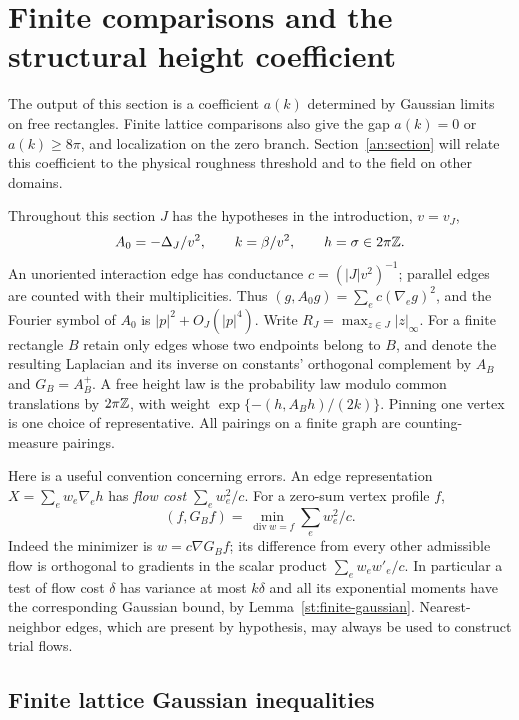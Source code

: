 \section{Finite comparisons and the structural height coefficient}
\label{st:section}

The output of this section is a coefficient $a(k)$ determined by
Gaussian limits on free rectangles.  Finite lattice comparisons also
give the gap $a(k)=0$ or $a(k)\ge8\pi$, and localization on the zero
branch.  Section~\ref{an:section} will relate this coefficient to the
physical roughness threshold and to the field on other domains.

Throughout this section $J$ has the hypotheses in the introduction, $v=v_J$,
\begin{equation}\label{st:normalization}
 A_0=-\Delta_J/v^2,\qquad k=\beta/v^2,\qquad h=\sigma\in2\pi\mathbb Z.
\end{equation}
An unoriented interaction edge has conductance $c=(|J|v^2)^{-1}$; parallel
edges are counted with their multiplicities. Thus
$(g,A_0g)=\sum_e c(\nabla_e g)^2$, and the Fourier symbol of $A_0$ is
$|p|^2+O_J(|p|^4)$. Write $R_J=\max_{z\in J}|z|_\infty$.
For a finite rectangle $B$ retain only edges whose two endpoints belong to
$B$, and denote the resulting Laplacian and its inverse on constants'
orthogonal complement by $A_B$ and $G_B=A_B^+$. A free height law is the
probability law modulo common translations by $2\pi\mathbb Z$, with weight
$\exp\{-(h,A_Bh)/(2k)\}$. Pinning one vertex is one choice of representative.
All pairings on a finite graph are counting-measure pairings.

Here is a useful convention concerning errors. An edge representation
$X=\sum_e w_e\nabla_e h$ has \emph{flow cost}
$\sum_e w_e^2/c$. For a zero-sum vertex profile $f$,
\begin{equation}\label{st:flow}
 (f,G_Bf)=\min_{\operatorname{div}w=f}\sum_e w_e^2/c.
\end{equation}
Indeed the minimizer is $w=c\nabla G_Bf$; its difference from every other
admissible flow is orthogonal to gradients in the scalar product
$\sum_e w_e w'_e/c$. In particular a test of flow cost $\delta$ has variance
at most $k\delta$ and all its exponential moments have the corresponding
Gaussian bound, by Lemma~\ref{st:finite-gaussian}. Nearest-neighbor edges,
which are present by hypothesis, may always be used to construct trial flows.

\subsection{Finite lattice Gaussian inequalities}

